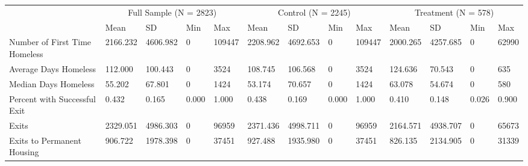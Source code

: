 \begin{tabular}{lllllllllllll}
\toprule
 & \multicolumn{4}{c}{Full Sample (N = 2823)} & \multicolumn{4}{c}{Control (N = 2245)} & \multicolumn{4}{c}{Treatment (N = 578)} \\
 & Mean & SD & Min & Max & Mean & SD & Min & Max & Mean & SD & Min & Max \\
\midrule
Number of First Time Homeless & 2166.232 & 4606.982 & 0 & 109447 & 2208.962 & 4692.653 & 0 & 109447 & 2000.265 & 4257.685 & 0 & 62990 \\
Average Days Homeless & 112.000 & 100.443 & 0 & 3524 & 108.745 & 106.568 & 0 & 3524 & 124.636 & 70.543 & 0 & 635 \\
Median Days Homeless & 55.202 & 67.801 & 0 & 1424 & 53.174 & 70.657 & 0 & 1424 & 63.078 & 54.674 & 0 & 580 \\
Percent with Successful Exit & 0.432 & 0.165 & 0.000 & 1.000 & 0.438 & 0.169 & 0.000 & 1.000 & 0.410 & 0.148 & 0.026 & 0.900 \\
Exits & 2329.051 & 4986.303 & 0 & 96959 & 2371.436 & 4998.711 & 0 & 96959 & 2164.571 & 4938.707 & 0 & 65673 \\
Exits to Permanent Housing & 906.722 & 1978.398 & 0 & 37451 & 927.488 & 1935.980 & 0 & 37451 & 826.135 & 2134.905 & 0 & 31339 \\
\bottomrule
\end{tabular}
